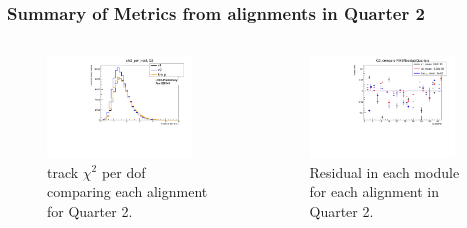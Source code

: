 \documentclass[aspectratio=1610, 12pt]{beamer}
\begin{document}
\begin{frame}\frametitle{Summary of Metrics from alignments in Quarter 2}
  \begin{columns}
    \begin{column}[c]{0.48\textwidth}
      \begin{figure}
        \centering
        \includegraphics[width=0.9\textwidth]{2023-mar-9-DPG/chi2_per_ndof_Q2.pdf}
        \caption{track $\chi^2$ per dof comparing each alignment for Quarter 2.}
      \end{figure}
    \end{column}
    \begin{column}{0.48\textwidth}
      \begin{figure}
        \includegraphics[width=0.9\textwidth]{2023-mar-9-DPG/RMSResidualQuarters_Q2.pdf}
        \caption{Residual in each module for each alignment in Quarter 2.}
      \end{figure}
    \end{column}
  \end{columns}
\end{frame}
\end{document}
